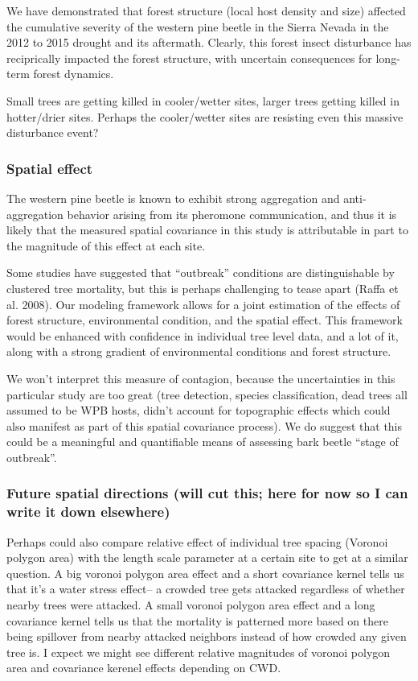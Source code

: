 \documentclass[]{article}
\begin{document}
We have demonstrated that forest structure (local host density and size)
affected the cumulative severity of the western pine beetle in the
Sierra Nevada in the 2012 to 2015 drought and its aftermath. Clearly,
this forest insect disturbance has reciprically impacted the forest
structure, with uncertain consequences for long-term forest dynamics.

Small trees are getting killed in cooler/wetter sites, larger trees
getting killed in hotter/drier sites. Perhaps the cooler/wetter sites
are resisting even this massive disturbance event?

\subsubsection{Spatial effect}\label{spatial-effect}

The western pine beetle is known to exhibit strong aggregation and
anti-aggregation behavior arising from its pheromone communication, and
thus it is likely that the measured spatial covariance in this study is
attributable in part to the magnitude of this effect at each site.

Some studies have suggested that ``outbreak'' conditions are
distinguishable by clustered tree mortality, but this is perhaps
challenging to tease apart (Raffa et al. 2008). Our modeling framework
allows for a joint estimation of the effects of forest structure,
environmental condition, and the spatial effect. This framework would be
enhanced with confidence in individual tree level data, and a lot of it,
along with a strong gradient of environmental conditions and forest
structure.

We won't interpret this measure of contagion, because the uncertainties
in this particular study are too great (tree detection, species
classification, dead trees all assumed to be WPB hosts, didn't account
for topographic effects which could also manifest as part of this
spatial covariance process). We do suggest that this could be a
meaningful and quantifiable means of assessing bark beetle ``stage of
outbreak''.

\subsubsection{Future spatial directions (will cut this; here for now so
I can write it down
elsewhere)}\label{future-spatial-directions-will-cut-this-here-for-now-so-i-can-write-it-down-elsewhere}

Perhaps could also compare relative effect of individual tree spacing
(Voronoi polygon area) with the length scale parameter at a certain site
to get at a similar question. A big voronoi polygon area effect and a
short covariance kernel tells us that it's a water stress effect-- a
crowded tree gets attacked regardless of whether nearby trees were
attacked. A small voronoi polygon area effect and a long covariance
kernel tells us that the mortality is patterned more based on there
being spillover from nearby attacked neighbors instead of how crowded
any given tree is. I expect we might see different relative magnitudes
of voronoi polygon area and covariance kerenel effects depending on CWD.
\end{document}
